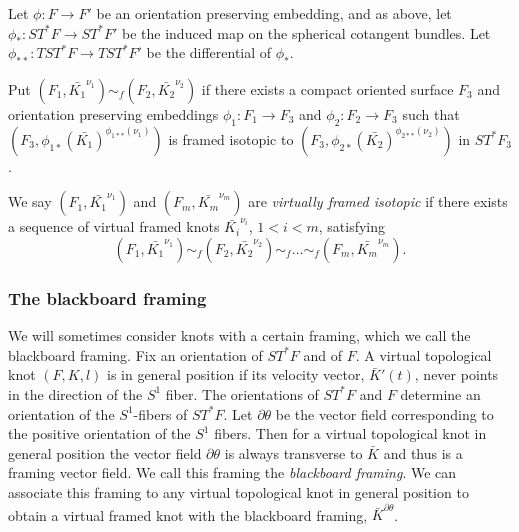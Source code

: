 Let $\phi: F\rightarrow F'$ be an orientation preserving embedding, and as above, let $\phi_*:ST^*F\rightarrow ST^*F'$ be the induced map on the spherical cotangent bundles. Let $\phi_{**}: TST^*F\rightarrow TST^*F'$ be the differential of $\phi_*$.

Put $(F_1, \bar{K_1}^{\nu_1}) \sim_f (F_2, \bar{K_2}^{\nu_2})$ if there exists a compact oriented surface $F_3$ and orientation preserving embeddings $\phi_1: F_1\rightarrow F_3$ and $\phi_2: F_2\rightarrow F_3$ such that $(F_3, \phi_{1*}(\bar{K_1})^{\phi_{1**}(\nu_1)})$ is framed isotopic to $(F_3, \phi_{2*}(\bar{K_2})^{\phi_{2**}(\nu_2)})$ in $ST^*F_3$.

  We say $(F_1, \bar{K_1}^{\nu_1})$ and $(F_m, \bar{K_m}^{\nu_m})$ are {\it virtually framed isotopic} if there exists a sequence of virtual framed knots $\bar{K_i}^{\nu_i}$, $1 < i < m$, satisfying
  $$(F_1, \bar{K_1}^{\nu_1})\sim_f (F_2, \bar{K_2}^{\nu_2}) \sim_f \dots \sim_f (F_m, \bar{K_m}^{\nu_m}).$$

\subsubsection{The blackboard framing}
We will sometimes consider knots with a certain framing, which we call the blackboard framing.  Fix an orientation of $ST^*F$ and of $F$.  A virtual topological knot $(F, K, l)$ is in general position if its velocity vector, $\bar{K}'(t)$, never points in the direction of the $S^1$ fiber.  The orientations of $ST^*F$ and $F$ determine an orientation of the $S^1$-fibers of $ST^*F$.  Let $\partial \theta$ be the vector field corresponding to the positive orientation of the $S^1$ fibers.  Then for a virtual topological knot in general position the vector field $\partial \theta$ is always transverse to $\bar{K}$ and thus is a framing vector field.  We call this framing the {\it blackboard framing}.  We can associate this framing to any virtual topological knot in general position to obtain a virtual framed knot with the blackboard framing, $\bar{K}^{\partial \theta}$.



